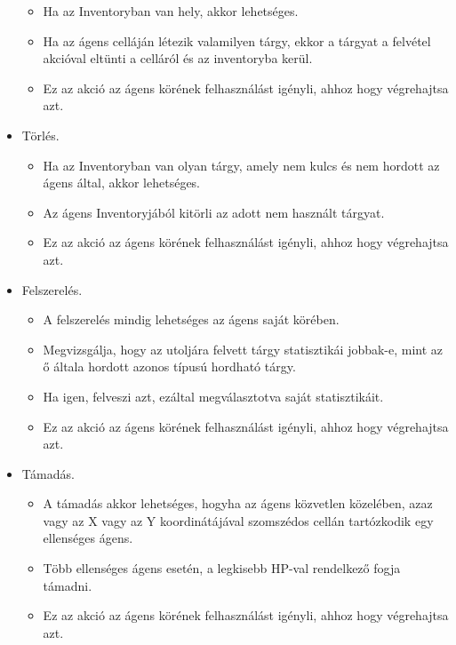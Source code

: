 \begin{itemize}
    \begin{itemize}
        \item Ha az Inventoryban van hely, akkor lehetséges.
        \item Ha az ágens celláján létezik valamilyen tárgy, ekkor a tárgyat a felvétel akcióval eltünti a celláról és az inventoryba kerül.
        \item Ez az akció az ágens körének felhasználást igényli, ahhoz hogy végrehajtsa azt.
    \end{itemize}

    \item Törlés. 
    
    \begin{itemize}
        \item Ha az Inventoryban van olyan tárgy, amely nem kulcs és nem hordott az ágens által, akkor lehetséges.
        \item Az ágens Inventoryjából kitörli az adott nem használt tárgyat.
        \item Ez az akció az ágens körének felhasználást igényli, ahhoz hogy végrehajtsa azt.
    \end{itemize}

    \item Felszerelés. 
    
    \begin{itemize}
        \item A felszerelés mindig lehetséges az ágens saját körében.
        \item Megvizsgálja, hogy az utoljára felvett tárgy statisztikái jobbak-e, mint az ő általa hordott azonos típusú hordható tárgy.
        \item Ha igen, felveszi azt, ezáltal megválasztotva saját statisztikáit.
        \item Ez az akció az ágens körének felhasználást igényli, ahhoz hogy végrehajtsa azt.
    \end{itemize}

    \item Támadás. 
    
    \begin{itemize}
        \item A támadás akkor lehetséges, hogyha az ágens közvetlen közelében, azaz vagy az X vagy az Y koordinátájával szomszédos cellán tartózkodik egy ellenséges ágens.
        \item Több ellenséges ágens esetén, a legkisebb HP-val rendelkező fogja támadni.
        \item Ez az akció az ágens körének felhasználást igényli, ahhoz hogy végrehajtsa azt.
    \end{itemize}

\end{itemize}

